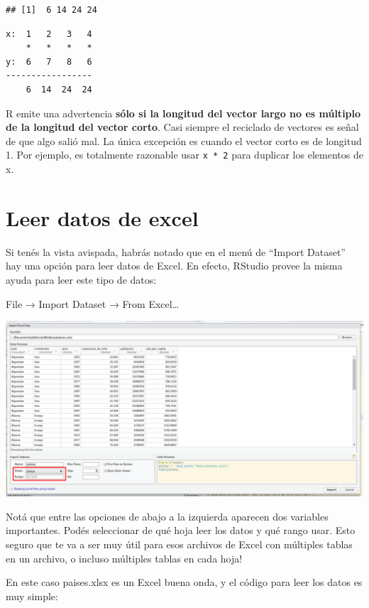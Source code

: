 \documentclass[
  openany]{book}
\begin{document}
\begin{verbatim}
## [1]  6 14 24 24
\end{verbatim}

\begin{verbatim}
x:  1   2   3   4
    *   *   *   *
y:  6   7   8   6
-----------------
    6  14  24  24
\end{verbatim}

R emite una advertencia \textbf{sólo si la longitud del vector largo no es múltiplo de la longitud del vector corto}.
Casi siempre el reciclado de vectores es señal de que algo salió mal.
La única excepción es cuando el vector corto es de longitud 1.
Por ejemplo, es totalmente razonable usar \texttt{x\ *\ 2} para duplicar los elementos de x.

\hypertarget{leer-datos-de-excel}{%
\section{Leer datos de excel}\label{leer-datos-de-excel}}

Si tenés la vista avispada, habrás notado que en el menú de ``Import Dataset'' hay una opción para leer datos de Excel.
En efecto, RStudio provee la misma ayuda para leer este tipo de datos:

File → Import Dataset → From Excel\ldots{}

\includegraphics{img/importar-paises-xl.png}

Notá que entre las opciones de abajo a la izquierda aparecen dos variables importantes.
Podés seleccionar de qué hoja leer los datos y qué rango usar.
Esto seguro que te va a ser muy útil para esos archivos de Excel con múltiples tablas en un archivo, o incluso múltiples tablas en cada hoja!

En este caso paises.xlsx es un Excel buena onda, y el código para leer los datos es muy simple:
\end{document}

